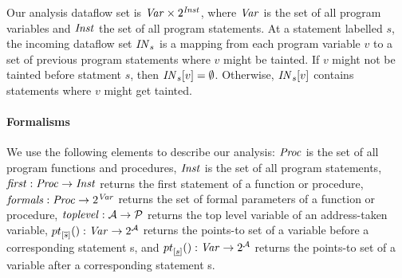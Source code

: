 Our analysis dataflow set is $\mathit{Var} \times 2^{\mathit{Inst}}$,
where $\mathit{Var}$ is the set of all program variables and
$\mathit{Inst}$ the set of all program statements. 
At a statement labelled $s$, the incoming dataflow set $\mathit{IN}_s$
is a mapping from each program variable $v$ to a set of
previous program statements where $v$ might be tainted.
If $v$ might not be tainted before statment $s$, then
$\mathit{IN}_s[v] = \emptyset$. Otherwise, $\mathit{IN}_s[v]$
contains statements where $v$ might get tainted.

\paragraph{Formalisms}
We use the following elements to describe our analysis:
$\mathit{Proc}$ is the set of all program functions and procedures,
$\mathit{Inst}$ is the set of all program statements,
$\mathit{first}{}: \mathit{Proc} \rightarrow \mathit{Inst}$ returns the first
statement of a function or procedure,
$\mathit{formals}{}: \mathit{Proc} \rightarrow 2^{\mathit{Var}}$ returns the
set of formal parameters of a function or procedure, 
$\mathit{toplevel}{}: \mathcal{A} \rightarrow \mathcal{P}$ returns the top level
variable of an address-taken variable,
${pt}_{[\overline{s}] }(): \mathit{Var} \rightarrow 2^{\mathcal{A}}$ returns the
points-to set of a variable before a corresponding statement s,
and ${pt}_{[\underline{s}]}(): \mathit{Var} \rightarrow 2^{\mathcal{A}}$ returns the
points-to set of a variable after a corresponding statement s.
